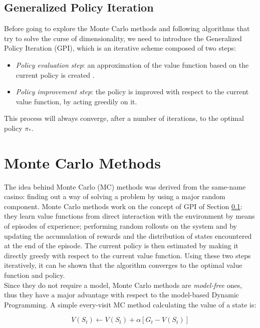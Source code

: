 \subsection{Generalized Policy Iteration}
\label{sec:gpi}
Before going to explore the Monte Carlo methods and following algorithms that try to solve the curse of dimensionality, we need to introduce the Generalized Policy Iteration (GPI), which is an iterative scheme composed of two steps:
\begin{itemize}
	\item \textit{Policy evaluation step}: an approximation of the value function based on the current policy is created .
	\item \textit{Policy improvement step}: the policy is improved with respect to the current value function, by acting greedily on it.
\end{itemize}

This process will always converge, after a number of iterations, to the optimal policy $\pi_*$.


\section{Monte Carlo Methods}
The idea behind Monte Carlo (MC)\cite{metropolis1949monte} methods was derived from the same-name casino: finding out a way of solving a problem by using a major random component. Monte Carlo methods work on the concept of GPI of Section \ref{sec:gpi}: they learn value functions from direct interaction with the environment by means of episodes of experience; performing random rollouts on the system and by updating the accumulation of rewards and the distribution of states encountered at the end of the episode. The current policy is then estimated by making it directly greedy with respect to the current value function. Using these two steps iteratively, it can be shown that the algorithm converges to the optimal value function and policy.
\\
\indent Since they do not require a model, Monte Carlo methods are \textit{model-free} ones, thus they have a major advantage with respect to the model-based Dynamic Programming. A simple every-visit MC method calculating the value of a state is:

\begin{equation}
	V(S_t) \gets V(S_t) + \alpha[G_t - V(S_t)]
	\label{eq:MC}
\end{equation}

